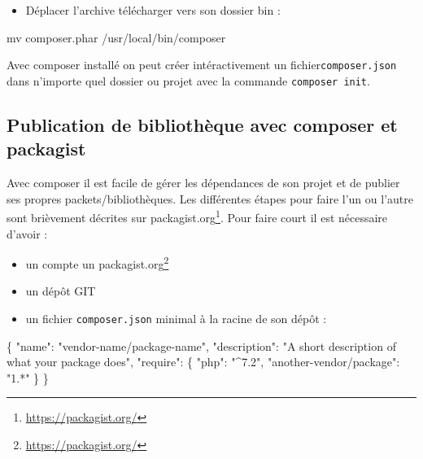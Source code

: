 \documentclass[11pt,a4paper,krantz2,11pt,oneside]{krantz}
\newenvironment{Shaded}{\begin{snugshade}}{\end{snugshade}}
\newcommand{\DataTypeTok}[1]{\textcolor[rgb]{0.27,0.27,0.27}{#1}}
\newcommand{\FunctionTok}[1]{\textcolor[rgb]{0,0,0}{#1}}
\newcommand{\NormalTok}[1]{#1}
\newcommand{\StringTok}[1]{\textcolor[rgb]{0.5,0.5,0.5}{#1}}
\providecommand{\tightlist}{%
  \setlength{\itemsep}{0pt}\setlength{\parskip}{0pt}}
\renewcommand{\href}[2]{#2\footnote{\url{#1}}}
\begin{document}
\begin{itemize}
\tightlist
\item
  Déplacer l'archive télécharger vers son dossier bin :
\end{itemize}

\begin{Shaded}
\begin{Highlighting}[]
\FunctionTok{mv}\NormalTok{ composer.phar /usr/local/bin/composer}
\end{Highlighting}
\end{Shaded}

Avec composer installé on peut créer intéractivement un fichier\texttt{composer.json} dans n'importe quel dossier ou projet avec la commande \texttt{composer\ init}.

\hypertarget{publication-de-bibliothuxe8que-avec-composer-et-packagist}{%
\subsection{Publication de bibliothèque avec composer et packagist}\label{publication-de-bibliothuxe8que-avec-composer-et-packagist}}

Avec composer il est facile de gérer les dépendances de son projet et de publier ses propres packets/bibliothèques. Les différentes étapes pour faire l'un ou l'autre sont brièvement décrites sur \href{https://packagist.org/}{packagist.org}. Pour faire court il est nécessaire d'avoir :

\begin{itemize}
\tightlist
\item
  un compte un \href{https://packagist.org/}{packagist.org}
\item
  un dépôt GIT
\item
  un fichier \texttt{composer.json} minimal à la racine de son dépôt :
\end{itemize}

\begin{Shaded}
\begin{Highlighting}[]
\FunctionTok{\{}
    \DataTypeTok{"name"}\FunctionTok{:} \StringTok{"vendor-name/package-name"}\FunctionTok{,}
    \DataTypeTok{"description"}\FunctionTok{:} \StringTok{"A short description of what your package does"}\FunctionTok{,}
    \DataTypeTok{"require"}\FunctionTok{:} \FunctionTok{\{}
        \DataTypeTok{"php"}\FunctionTok{:} \StringTok{"^7.2"}\FunctionTok{,}
        \DataTypeTok{"another-vendor/package"}\FunctionTok{:} \StringTok{"1.*"}
    \FunctionTok{\}}
\FunctionTok{\}}
\end{Highlighting}
\end{Shaded}
\end{document}
